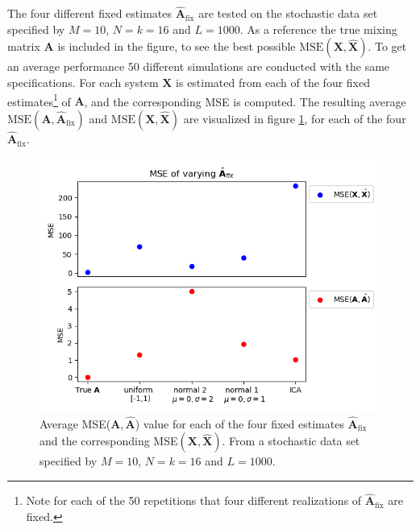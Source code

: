 The four different fixed estimates $\hat{\mathbf{A}}_{\text{fix}}$ are tested on the stochastic data set specified by $M = 10$, $N = k = 16$ and $L = 1000$. 
As a reference the true mixing matrix $\mathbf{A}$ is included in the figure, to see the best possible $\text{MSE}(\mathbf{X}, \hat{\mathbf{X}})$.
To get an average performance 50 different simulations are conducted with the same specifications. For each system $\mathbf{X}$ is estimated from each of the four fixed estimates\footnote{Note for each of the 50 repetitions that four different realizations of $\hat{\mathbf{A}}_{\text{fix}}$ are fixed.} of $\mathbf{A}$, and the corresponding MSE is computed. 
The resulting average $\text{MSE}(\mathbf{A}, \hat{\mathbf{A}}_{\text{fix}})$ and $\text{MSE}(\mathbf{X}, \hat{\mathbf{X}})$ are visualized in figure \ref{fig:vary_A}, for each of the four $\hat{\mathbf{A}}_{\text{fix}}$. 
\begin{figure}[H]
\centering
\includegraphics[scale=0.5]{figures/ch_6/A_fix1.png}
\caption{Average MSE($\textbf{A},\hat{\mathbf{A}}$) value for each of the four fixed estimates $\hat{\mathbf{A}}_{\text{fix}}$ and the corresponding MSE$(\textbf{X},\hat{\mathbf{X}})$. From a stochastic data set specified by $M = 10$, $N = k = 16$ and $L = 1000$.}
\label{fig:vary_A}
\end{figure}
\noindent
%
